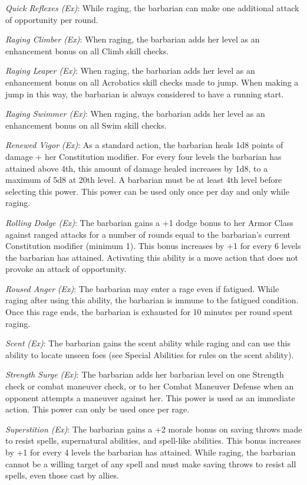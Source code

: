 \textit{Quick Reflexes (Ex)}: While raging, the barbarian can make one additional attack of opportunity per round.
				
\textit{Raging Climber (Ex)}: When raging, the barbarian adds her level as an enhancement bonus on all Climb skill checks.
				
\textit{Raging Leaper (Ex)}: When raging, the barbarian adds her level as an enhancement bonus on all Acrobatics skill checks made to jump. When making a jump in this way, the barbarian is always considered to have a running start.
				
\textit{Raging Swimmer (Ex)}: When raging, the barbarian adds her level as an enhancement bonus on all Swim skill checks.
				
\textit{Renewed Vigor} \textit{(Ex)}: As a standard action, the barbarian heals 1d8 points of damage + her Constitution modifier. For every four levels the barbarian has attained above 4th, this amount of damage healed increases by 1d8, to a maximum of 5d8 at 20th level. A barbarian must be at least 4th level before selecting this power. This power can be used only once per day and only while raging.
				
\textit{Rolling Dodge (Ex)}: The barbarian gains a +1 dodge bonus to her Armor Class against ranged attacks for a number of rounds equal to the barbarian's current Constitution modifier (minimum 1). This bonus increases by +1 for every 6 levels the barbarian has attained. Activating this ability is a move action that does not provoke an attack of opportunity.
				
\textit{Roused Anger} \textit{(Ex)}: The barbarian may enter a rage even if fatigued. While raging after using this ability, the barbarian is immune to the fatigued condition. Once this rage ends, the barbarian is exhausted for 10 minutes per round spent raging.
				
\textit{Scent} \textit{(Ex)}: The barbarian gains the scent ability while raging and can use this ability to locate unseen foes (see Special Abilities for rules on the scent ability).
				
\textit{Strength Surge} \textit{(Ex)}: The barbarian adds her barbarian level on one Strength check or combat maneuver check, or to her Combat Maneuver Defense when an opponent attempts a maneuver against her. This power is used as an immediate action. This power can only be used once per rage.
				
\textit{Superstition (Ex)}: The barbarian gains a +2 morale bonus on saving throws made to resist spells, supernatural abilities, and spell-like abilities. This bonus increases by +1 for every 4 levels the barbarian has attained. While raging, the barbarian cannot be a willing target of any spell and must make saving throws to resist all spells, even those cast by allies.
				
